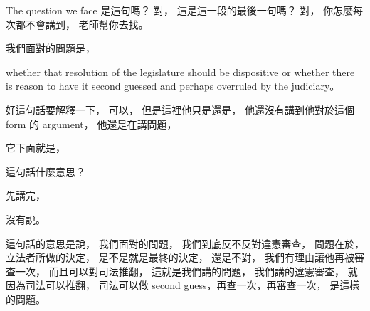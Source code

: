 \hypertarget{w06:cue:1893}{}The question we face
\hypertarget{w06:cue:1894}{}是這句嗎？
\hypertarget{w06:cue:1895}{}對，
\hypertarget{w06:cue:1896}{}這是這一段的最後一句嗎？
\hypertarget{w06:cue:1897}{}對，
\hypertarget{w06:cue:1898}{}你怎麼每次都不會講到，
\hypertarget{w06:cue:1899}{}老師幫你去找。

\hypertarget{w06:cue:1900}{}我們面對的問題是，

\hypertarget{w06:cue:1901}{}whether that resolution of the legislature
\hypertarget{w06:cue:1902}{}should be dispositive
\hypertarget{w06:cue:1903}{}or whether there is reason to have it second guessed
\hypertarget{w06:cue:1904}{}and perhaps overruled by the judiciary。

\hypertarget{w06:cue:1905}{}好這句話要解釋一下，
\hypertarget{w06:cue:1906}{}可以，
\hypertarget{w06:cue:1907}{}但是這裡他只是還是，
\hypertarget{w06:cue:1908}{}他還沒有講到他對於這個 form 的 argument，
\hypertarget{w06:cue:1909}{}他還是在講問題，

\hypertarget{w06:cue:1910}{}它下面就是，

\hypertarget{w06:cue:1911}{}這句話什麼意思？

\hypertarget{w06:cue:1912}{}先講完，

\hypertarget{w06:cue:1913}{}沒有說。

\hypertarget{w06:cue:1914}{}這句話的意思是說，
\hypertarget{w06:cue:1915}{}我們面對的問題，
\hypertarget{w06:cue:1916}{}我們到底反不反對違憲審查，
\hypertarget{w06:cue:1917}{}問題在於，
\hypertarget{w06:cue:1918}{}立法者所做的決定，
\hypertarget{w06:cue:1919}{}是不是就是最終的決定，
\hypertarget{w06:cue:1920}{}還是不對，
\hypertarget{w06:cue:1921}{}我們有理由讓他再被審查一次，
\hypertarget{w06:cue:1922}{}而且可以對司法推翻，
\hypertarget{w06:cue:1923}{}這就是我們講的問題，
\hypertarget{w06:cue:1924}{}我們講的違憲審查，
\hypertarget{w06:cue:1925}{}就因為司法可以推翻，
\hypertarget{w06:cue:1926}{}司法可以做 second guess，再查一次，再審查一次，
\hypertarget{w06:cue:1927}{}是這樣的問題。

